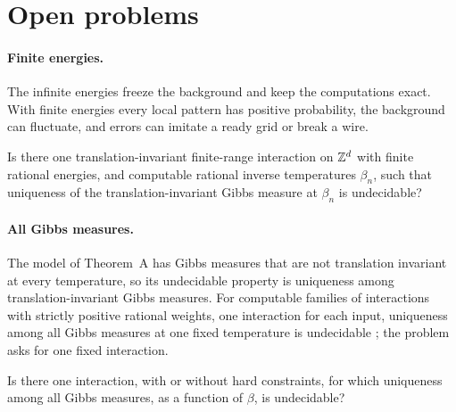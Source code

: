 \section{Open problems}\label{sec:open}

\paragraph{Finite energies.} The infinite energies freeze the background and keep the computations exact. With finite energies every local pattern has positive probability, the background can fluctuate, and errors can imitate a ready grid or break a wire.

\begin{problem}\label{prob:finite}
Is there one translation-invariant finite-range interaction on $\mathbb{Z}^d$ with finite rational energies, and computable rational inverse temperatures $\beta_n$, such that uniqueness of the translation-invariant Gibbs measure at $\beta_n$ is undecidable?
\end{problem}

\paragraph{All Gibbs measures.} The model of Theorem~A has Gibbs measures that are not translation invariant at every temperature, so its undecidable property is uniqueness among translation-invariant Gibbs measures. For computable families of interactions with strictly positive rational weights, one interaction for each input, uniqueness among all Gibbs measures at one fixed temperature is undecidable \cite{DM26thermal}; the problem asks for one fixed interaction.

\begin{problem}\label{prob:all}
Is there one interaction, with or without hard constraints, for which uniqueness among all Gibbs measures, as a function of $\beta$, is undecidable?
\end{problem}

